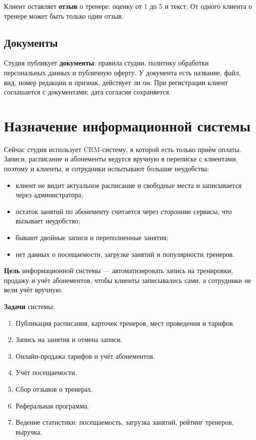 \documentclass[14pt,a4paper]{extarticle}
\begin{document}
Клиент оставляет \textbf{отзыв} о тренере: оценку от 1 до 5 и текст. От одного клиента о тренере может быть только один отзыв.

\subsection{Документы}

Студия публикует \textbf{документы}: правила студии, политику обработки персональных данных и публичную оферту. У документа есть название, файл, вид, номер редакции и признак, действует ли он. При регистрации клиент соглашается с документами; дата согласия сохраняется.

\section{Назначение информационной системы}

Сейчас студия использует CRM-систему, в которой есть только приём оплаты. Записи, расписание и абонементы ведутся вручную в переписке с клиентами, поэтому и клиенты, и сотрудники испытывают большие неудобства:
\begin{itemize}
  \item клиент не видит актуальное расписание и свободные места и записывается через администратора;
  \item остаток занятий по абонементу считается через сторонние сервисы, что вызывает неудобство;
  \item бывают двойные записи и переполненные занятия;
  \item нет данных о посещаемости, загрузке занятий и популярности тренеров.
\end{itemize}

\textbf{Цель} информационной системы --- автоматизировать запись на тренировки, продажу и учёт абонементов, чтобы клиенты записывались сами, а сотрудники не вели учёт вручную.

\textbf{Задачи} системы:
\begin{enumerate}
  \item Публикация расписания, карточек тренеров, мест проведения и тарифов.
  \item Запись на занятия и отмена записи.
  \item Онлайн-продажа тарифов и учёт абонементов.
  \item Учёт посещаемости.
  \item Сбор отзывов о тренерах.
  \item Реферальная программа.
  \item Ведение статистики: посещаемость, загрузка занятий, рейтинг тренеров, выручка.
\end{enumerate}
\end{document}
